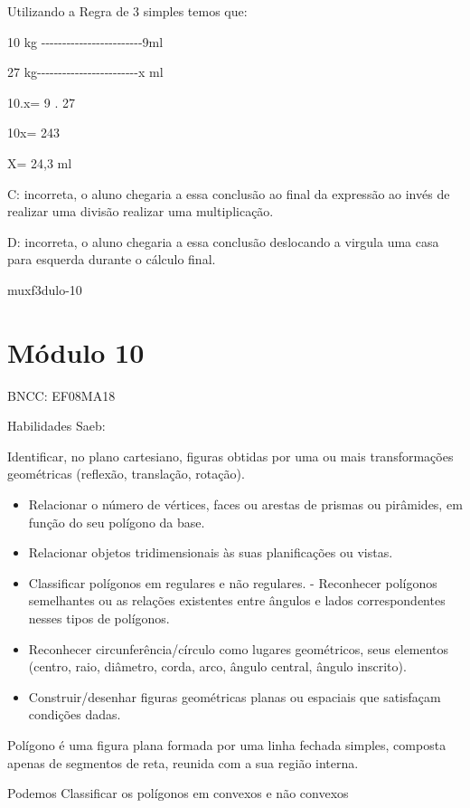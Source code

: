 {Utilizando a Regra de 3 simples temos que:

10 kg
-\/-\/-\/-\/-\/-\/-\/-\/-\/-\/-\/-\/-\/-\/-\/-\/-\/-\/-\/-\/-\/-\/-\/-9ml

27
kg-\/-\/-\/-\/-\/-\/-\/-\/-\/-\/-\/-\/-\/-\/-\/-\/-\/-\/-\/-\/-\/-\/-\/-x
ml

10.x= 9 . 27

10x= 243

X= 24,3 ml

C: incorreta, o aluno chegaria a essa conclusão ao final da expressão ao
invés de realizar uma divisão realizar uma multiplicação.

D: incorreta, o aluno chegaria a essa conclusão deslocando a virgula uma
casa para esquerda durante o cálculo final.

muxf3dulo-10}{%
\section{Módulo 10}

BNCC: EF08MA18

Habilidades Saeb:

Identificar, no plano cartesiano, figuras obtidas por uma ou mais
transformações geométricas (reflexão, translação, rotação).

\begin{itemize}
\item
  Relacionar o número de vértices, faces ou arestas de prismas ou
  pirâmides, em função do seu polígono da base.
\item
  Relacionar objetos tridimensionais às suas planificações ou vistas.
\item
  Classificar polígonos em regulares e não regulares. - Reconhecer
  polígonos semelhantes ou as relações existentes entre ângulos e lados
  correspondentes nesses tipos de polígonos.
\item
  Reconhecer circunferência/círculo como lugares geométricos, seus
  elementos (centro, raio, diâmetro, corda, arco, ângulo central, ângulo
  inscrito).
\item
  Construir/desenhar figuras geométricas planas ou espaciais que
  satisfaçam condições dadas.
\end{itemize}

Polígono é uma figura plana formada por uma linha fechada simples,
composta apenas de segmentos de reta, reunida com a sua região interna.

Podemos Classificar os polígonos em convexos e não convexos

}
